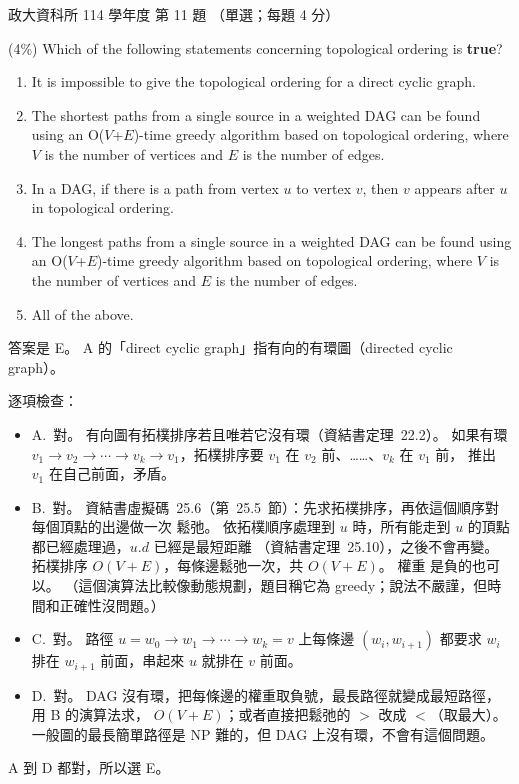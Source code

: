 \begin{pastexam}[label={px:nccu-114-dsa-11}]{政大資科所 114 學年度 第 11 題}
（單選；每題 4 分）

(4\%) Which of the following statements concerning topological ordering is \textbf{true}?
\begin{enumerate}[label=\Alph*.]
\item It is impossible to give the topological ordering for a direct cyclic graph.
\item The shortest paths from a single source in a weighted DAG can be found using an
O($V$+$E$)-time greedy algorithm based on topological ordering, where $V$ is the number of
vertices and $E$ is the number of edges.
\item In a DAG, if there is a path from vertex $u$ to vertex $v$, then $v$ appears after $u$ in
topological ordering.
\item The longest paths from a single source in a weighted DAG can be found using an
O($V$+$E$)-time greedy algorithm based on topological ordering, where $V$ is the number of
vertices and $E$ is the number of edges.
\item All of the above.
\end{enumerate}
\end{pastexam}

\begin{pastsoln}
答案是 E。 A 的「direct cyclic graph」指有向的有環圖（directed cyclic graph）。

逐項檢查：
\begin{itemize}
\item A.~對。 有向圖有拓樸排序若且唯若它沒有環（資結書定理~22.2）。 如果有環
$v_1 \to v_2 \to \cdots \to v_k \to v_1$，拓樸排序要 $v_1$ 在 $v_2$ 前、……、$v_k$ 在 $v_1$ 前，
推出 $v_1$ 在自己前面，矛盾。
\item B.~對。 資結書虛擬碼~25.6（第~25.5~節）：先求拓樸排序，再依這個順序對每個頂點的出邊做一次
鬆弛。 依拓樸順序處理到 $u$ 時，所有能走到 $u$ 的頂點都已經處理過，$u.d$ 已經是最短距離
（資結書定理~25.10），之後不會再變。 拓樸排序 $O(V + E)$，每條邊鬆弛一次，共 $O(V + E)$。 權重
是負的也可以。 （這個演算法比較像動態規劃，題目稱它為 greedy；說法不嚴謹，但時間和正確性沒問題。）
\item C.~對。 路徑 $u = w_0 \to w_1 \to \cdots \to w_k = v$ 上每條邊 $(w_{i}, w_{i+1})$ 都要求
$w_i$ 排在 $w_{i+1}$ 前面，串起來 $u$ 就排在 $v$ 前面。
\item D.~對。 DAG 沒有環，把每條邊的權重取負號，最長路徑就變成最短路徑，用 B 的演算法求，
$O(V + E)$；或者直接把鬆弛的 $>$ 改成 $<$（取最大）。 一般圖的最長簡單路徑是 NP 難的，但 DAG
上沒有環，不會有這個問題。
\end{itemize}
A 到 D 都對，所以選 E。
\end{pastsoln}
